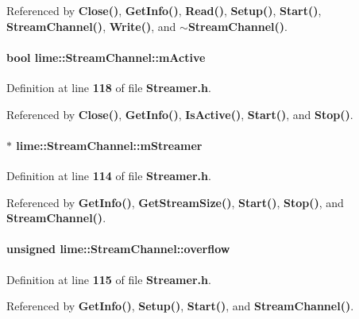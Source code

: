 Referenced by {\bf Close()}, {\bf Get\+Info()}, {\bf Read()}, {\bf Setup()}, {\bf Start()}, {\bf Stream\+Channel()}, {\bf Write()}, and {\bf $\sim$\+Stream\+Channel()}.

\paragraph[{m\+Active}]{\setlength{\rightskip}{0pt plus 5cm}bool lime\+::\+Stream\+Channel\+::m\+Active}\label{classlime_1_1StreamChannel_a011647e1a39ffebb16b1be31dd0cefaa}


Definition at line {\bf 118} of file {\bf Streamer.\+h}.



Referenced by {\bf Close()}, {\bf Get\+Info()}, {\bf Is\+Active()}, {\bf Start()}, and {\bf Stop()}.

\paragraph[{m\+Streamer}]{$\ast$ lime\+::\+Stream\+Channel\+::m\+Streamer}\label{classlime_1_1StreamChannel_a64be21022bda0e145ff2c3799eb162be}


Definition at line {\bf 114} of file {\bf Streamer.\+h}.



Referenced by {\bf Get\+Info()}, {\bf Get\+Stream\+Size()}, {\bf Start()}, {\bf Stop()}, and {\bf Stream\+Channel()}.

\paragraph[{overflow}]{\setlength{\rightskip}{0pt plus 5cm}unsigned lime\+::\+Stream\+Channel\+::overflow}\label{classlime_1_1StreamChannel_adb0b3fcd096dce1b697190d0541e0b3d}


Definition at line {\bf 115} of file {\bf Streamer.\+h}.



Referenced by {\bf Get\+Info()}, {\bf Setup()}, {\bf Start()}, and {\bf Stream\+Channel()}.

